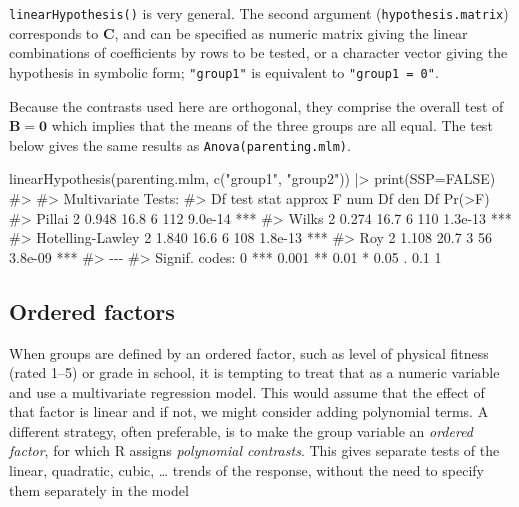 \documentclass[
  letterpaper,
  10pt,
  krantz2]{krantz}
\makeatletter
\newenvironment{Shaded}{\begin{snugshade}}{\end{snugshade}}
\newcommand{\AttributeTok}[1]{\textcolor[rgb]{0.40,0.45,0.13}{#1}}
\newcommand{\CommentTok}[1]{\textcolor[rgb]{0.37,0.37,0.37}{#1}}
\newcommand{\ConstantTok}[1]{\textcolor[rgb]{0.56,0.35,0.01}{#1}}
\newcommand{\FunctionTok}[1]{\textcolor[rgb]{0.28,0.35,0.67}{#1}}
\newcommand{\NormalTok}[1]{\textcolor[rgb]{0.00,0.23,0.31}{#1}}
\newcommand{\SpecialCharTok}[1]{\textcolor[rgb]{0.37,0.37,0.37}{#1}}
\newcommand{\StringTok}[1]{\textcolor[rgb]{0.13,0.47,0.30}{#1}}
\newenvironment{kframe}{%
  \medskip{}
  \setlength{\fboxsep}{.8em}
  \def\at@end@of@kframe{}%
  \ifinner\ifhmode%
  \def\at@end@of@kframe{\end{minipage}}%
  \begin{minipage}{\columnwidth}%
  \fi\fi%
  \def\FrameCommand##1{\hskip\@totalleftmargin \hskip-\fboxsep
  \colorbox{shadecolor}{##1}\hskip-\fboxsep
      \hskip-\linewidth \hskip-\@totalleftmargin \hskip\columnwidth}%
  \MakeFramed {\advance\hsize-\width
    \@totalleftmargin\z@ \linewidth\hsize
    \@setminipage}}%
{\par\unskip\endMakeFramed%
  \at@end@of@kframe}
\renewenvironment{Shaded}{\begin{kframe}}{\end{kframe}}
\makeatother
\begin{document}
\texttt{linearHypothesis()} is very general. The second argument
(\texttt{hypothesis.matrix}) corresponds to \(\mathbf{C}\), and can be
specified as numeric matrix giving the linear combinations of
coefficients by rows to be tested, or a character vector giving the
hypothesis in symbolic form; \texttt{"group1"} is equivalent to
\texttt{"group1\ =\ 0"}.

Because the contrasts used here are orthogonal, they comprise the
overall test of \(\mathbf{B} = \mathbf{0}\) which implies that the means
of the three groups are all equal. The test below gives the same results
as \texttt{Anova(parenting.mlm)}.

\begin{Shaded}
\begin{Highlighting}[]
\FunctionTok{linearHypothesis}\NormalTok{(parenting.mlm, }\FunctionTok{c}\NormalTok{(}\StringTok{"group1"}\NormalTok{, }\StringTok{"group2"}\NormalTok{)) }\SpecialCharTok{|\textgreater{}} 
  \FunctionTok{print}\NormalTok{(}\AttributeTok{SSP=}\ConstantTok{FALSE}\NormalTok{)}
\CommentTok{\#\textgreater{} }
\CommentTok{\#\textgreater{} Multivariate Tests: }
\CommentTok{\#\textgreater{}                  Df test stat approx F num Df den Df  Pr(\textgreater{}F)    }
\CommentTok{\#\textgreater{} Pillai            2     0.948     16.8      6    112 9.0e{-}14 ***}
\CommentTok{\#\textgreater{} Wilks             2     0.274     16.7      6    110 1.3e{-}13 ***}
\CommentTok{\#\textgreater{} Hotelling{-}Lawley  2     1.840     16.6      6    108 1.8e{-}13 ***}
\CommentTok{\#\textgreater{} Roy               2     1.108     20.7      3     56 3.8e{-}09 ***}
\CommentTok{\#\textgreater{} {-}{-}{-}}
\CommentTok{\#\textgreater{} Signif. codes:  0 \textquotesingle{}***\textquotesingle{} 0.001 \textquotesingle{}**\textquotesingle{} 0.01 \textquotesingle{}*\textquotesingle{} 0.05 \textquotesingle{}.\textquotesingle{} 0.1 \textquotesingle{} \textquotesingle{} 1}
\end{Highlighting}
\end{Shaded}

\subsection{Ordered factors}\label{ordered-factors}

When groups are defined by an ordered factor, such as level of physical
fitness (rated 1--5) or grade in school, it is tempting to treat that as
a numeric variable and use a multivariate regression model. This would
assume that the effect of that factor is linear and if not, we might
consider adding polynomial terms. A different strategy, often
preferable, is to make the group variable an \emph{ordered factor}, for
which R assigns \emph{polynomial contrasts}. This gives separate tests
of the linear, quadratic, cubic, \ldots{} trends of the response,
without the need to specify them separately in the model
\end{document}
